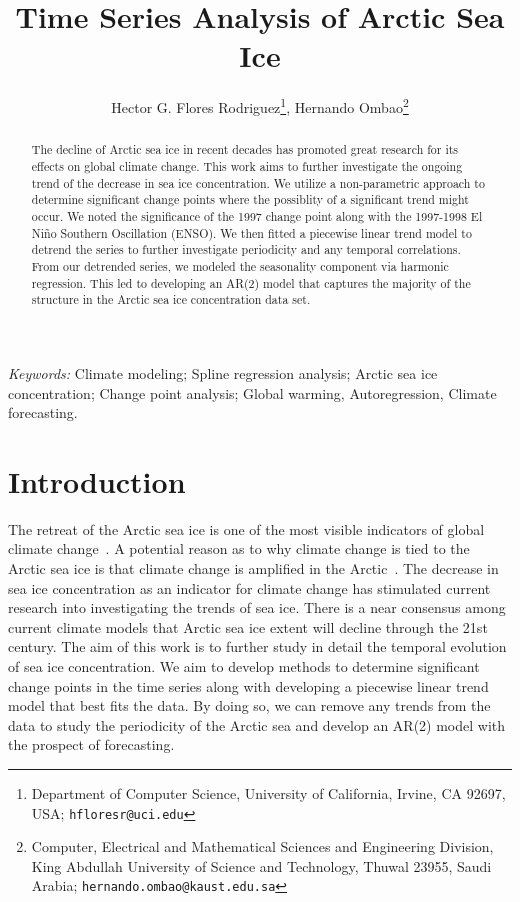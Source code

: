 \documentclass[12pt]{article}
\begin{document}
\date{}
\def\spacingset#1{\renewcommand{\baselinestretch}%
{#1}\small\normalsize} \spacingset{1}


\title{\bf Time Series Analysis of Arctic Sea Ice}
\author{Hector G. Flores Rodriguez\footnote{Department of Computer Science, University of California, Irvine, CA 92697, USA; \texttt{hfloresr@uci.edu}}, Hernando Ombao\footnote{Computer, Electrical and Mathematical Sciences and Engineering Division, King Abdullah University of Science and Technology, Thuwal 23955, Saudi Arabia; \texttt{hernando.ombao@kaust.edu.sa}}}
\maketitle


\bigskip
\begin{abstract}
The decline of Arctic sea ice in recent decades has promoted great research for its effects on global climate change. This work aims to further investigate the ongoing trend of the decrease in sea ice concentration. We utilize a non-parametric approach to determine significant change points where the possiblity of a significant trend might occur. We noted the significance of the 1997 change point along with the 1997-1998 El Niño Southern Oscillation (ENSO). We then fitted a piecewise linear trend model to detrend the series to further investigate periodicity and any temporal correlations. From our detrended series, we modeled the seasonality component via harmonic regression. This led to developing an AR(2) model that captures the majority of the structure in the Arctic sea ice concentration data set.
\end{abstract}

\noindent%
{\it Keywords:}  Climate modeling; Spline regression analysis; Arctic sea ice concentration; Change point analysis; Global warming, Autoregression, Climate forecasting.
\vfill


\newpage
\spacingset{2} %
\section{Introduction} \label{sec:intro}
The retreat of the Arctic sea ice is one of the most visible indicators of global climate change~\citep{zhang}. A potential reason as to why climate change is tied to the Arctic sea ice is that climate change is amplified in the Arctic~\citep{pithan}. The decrease in sea ice concentration as an indicator for climate change has stimulated current research into investigating the trends of sea ice. There is a near consensus among current climate models that Arctic sea ice extent will decline through the 21st century. The aim of this work is to further study in detail the temporal evolution of sea ice concentration. We aim to develop methods to determine significant change points in the time series along with developing a piecewise linear trend model that best fits the data. By doing so, we can remove any trends from the data to study the periodicity of the Arctic sea and develop an AR(2) model with the prospect of forecasting.
\end{document}
